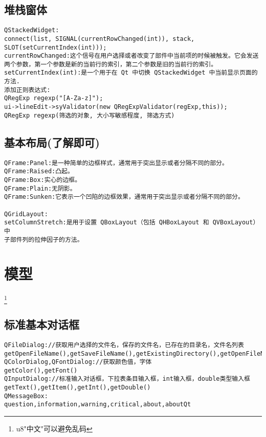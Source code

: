 \documentclass[11pt]{article}
\begin{document}
\subsection{堆栈窗体}
\begin{verbatim}
QStackedWidget:
connect(list, SIGNAL(currentRowChanged(int)), stack, SLOT(setCurrentIndex(int)));
currentRowChanged:这个信号在用户选择或者改变了部件中当前项的时候被触发。它会发送两个参数，第一个参数是新的当前行的索引，第二个参数是旧的当前行的索引。
setCurrentIndex(int):是一个用于在 Qt 中切换 QStackedWidget 中当前显示页面的方法.
添加正则表达式:
QRegExp regexp("[A-Za-z]");
ui->lineEdit->syValidator(new QRegExpValidator(regExp,this));
QRegExp regexp(筛选的对象, 大小写敏感程度, 筛选方式)

\end{verbatim}
\pagebreak
\subsection{基本布局(了解即可)}
\begin{verbatim}
QFrame:Panel:是一种简单的边框样式，通常用于突出显示或者分隔不同的部分。
QFrame:Raised:凸起。
QFrame:Box:实心的边框。
QFrame:Plain:无阴影。
QFrame:Sunken:它表示一个凹陷的边框效果，通常用于突出显示或者分隔不同的部分。

QGridLayout:
setColumnStretch:是用于设置 QBoxLayout（包括 QHBoxLayout 和 QVBoxLayout）中
子部件列的拉伸因子的方法。
\end{verbatim}

\newpage

\section{模型}
\footnote{u8"中文"可以避免乱码}
\subsection{标准基本对话框}

\begin{verbatim}
QFileDialog://获取用户选择的文件名，保存的文件名，已存在的目录名，文件名列表
getOpenFileName(),getSaveFileName(),getExistingDirectory(),getOpenFileNames
QColorDialog,QFontDialog://获取颜色值，字体
getColor(),getFont()
QInputDialog://标准输入对话框，下拉表条目输入框，int输入框，double类型输入框
getText(),getItem(),getInt(),getDouble()
QMessageBox:
question,information,warning,critical,about,aboutQt
\end{verbatim}
\newpage
\end{document}
